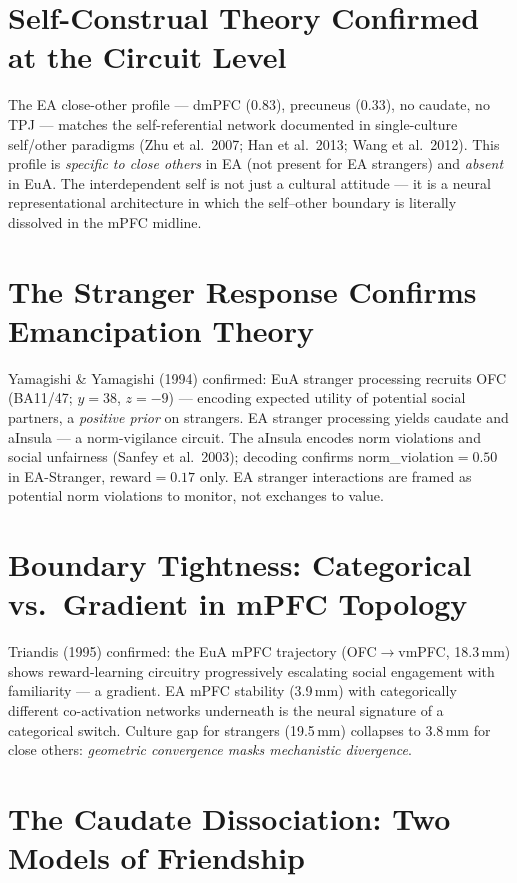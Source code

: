 \documentclass[11pt,a4paper]{report}
\begin{document}
\section*{Self-Construal Theory Confirmed at the Circuit Level}

The EA close-other profile --- dmPFC (0.83), precuneus (0.33), no caudate, no TPJ ---
matches the self-referential network documented in single-culture self/other paradigms
(Zhu et al.\ 2007; Han et al.\ 2013; Wang et al.\ 2012). This profile is \emph{specific to
close others} in EA (not present for EA strangers) and \emph{absent} in EuA. The
interdependent self is not just a cultural attitude --- it is a neural representational
architecture in which the self--other boundary is literally dissolved in the mPFC midline.

\section*{The Stranger Response Confirms Emancipation Theory}

Yamagishi \& Yamagishi (1994) confirmed: EuA stranger processing recruits OFC (BA11/47;
$y=38$, $z=-9$) --- encoding expected utility of potential social partners, a \emph{positive
prior} on strangers. EA stranger processing yields caudate and aInsula --- a norm-vigilance
circuit. The aInsula encodes norm violations and social unfairness (Sanfey et al.\ 2003);
decoding confirms norm\_violation$=0.50$ in EA-Stranger, reward$=0.17$ only. EA stranger
interactions are framed as potential norm violations to monitor, not exchanges to value.

\section*{Boundary Tightness: Categorical vs.\ Gradient in mPFC Topology}

Triandis (1995) confirmed: the EuA mPFC trajectory (OFC$\to$vmPFC, 18.3\,mm) shows
reward-learning circuitry progressively escalating social engagement with familiarity ---
a gradient. EA mPFC stability (3.9\,mm) with categorically different co-activation networks
underneath is the neural signature of a categorical switch. Culture gap for strangers
(19.5\,mm) collapses to 3.8\,mm for close others: \emph{geometric convergence masks
mechanistic divergence}.

\section*{The Caudate Dissociation: Two Models of Friendship}
\end{document}
